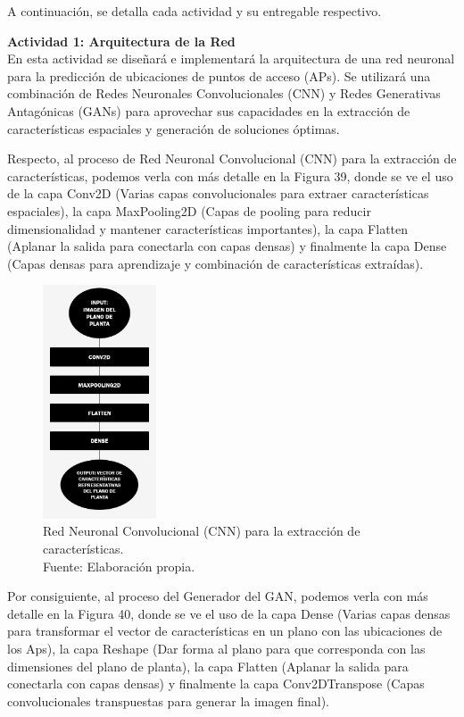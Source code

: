 A continuación, se detalla cada actividad y su entregable respectivo.

\textbf{Actividad 1: Arquitectura de la Red}
\\
En esta actividad se diseñará e implementará la arquitectura de una red neuronal para la predicción de ubicaciones de puntos de acceso (APs). Se utilizará una combinación de Redes Neuronales Convolucionales (CNN) y Redes Generativas Antagónicas (GANs) para aprovechar sus capacidades en la extracción de características espaciales y generación de soluciones óptimas.

Respecto, al proceso de Red Neuronal Convolucional (CNN) para la extracción de características, podemos verla con más detalle en la Figura 39, donde se ve el uso de la capa Conv2D (Varias capas convolucionales para extraer características espaciales), la capa MaxPooling2D (Capas de pooling para reducir dimensionalidad y mantener características importantes), la capa Flatten (Aplanar la salida para conectarla con capas densas) y finalmente la capa Dense (Capas densas para aprendizaje y combinación de características extraídas).

\begin{figure}[H]
	\centering
	\includegraphics[width=0.3\textwidth]{3/figures/CNN_redneuro.jpg}
	\caption[Red Neuronal Convolucional (CNN) para la extracción de características]{Red Neuronal Convolucional (CNN) para la extracción de características.\\ Fuente: Elaboración propia.}
	\label{3:4}
\end{figure}


Por consiguiente, al proceso del Generador del GAN, podemos verla con más detalle en la Figura 40, donde se ve el uso de la capa Dense (Varias capas densas para transformar el vector de características en un plano con las ubicaciones de los Aps), la capa Reshape (Dar forma al plano para que corresponda con las dimensiones del plano de planta), la capa Flatten (Aplanar la salida para conectarla con capas densas) y finalmente la capa Conv2DTranspose (Capas convolucionales transpuestas para generar la imagen final).

